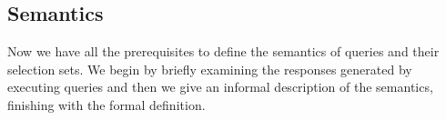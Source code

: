 








 
\subsection{Semantics}\label{subsec:semantics}
Now we have all the prerequisites to define the semantics of \gql queries and their selection sets. We begin by briefly examining the responses generated by executing queries and then we give an informal description of the semantics, finishing with the formal definition. %


